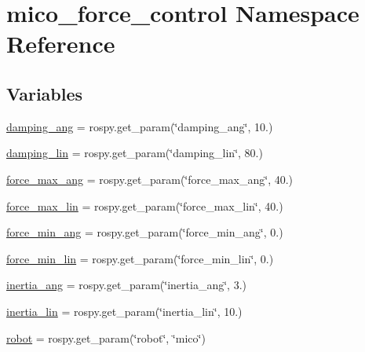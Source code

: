 \hypertarget{namespacemico__force__control}{}\section{mico\+\_\+force\+\_\+control Namespace Reference}
\label{namespacemico__force__control}
\subsection*{Variables}
\begin{DoxyCompactItemize}
\item 
\hyperlink{namespacemico__force__control_a92927656a13dc0f41e49ba262d47d74a}{damping\+\_\+ang} = rospy.\+get\+\_\+param(\char`\"{}damping\+\_\+ang\char`\"{}, 10.)
\item 
\hyperlink{namespacemico__force__control_a1355006730f1faaee4334f0c43f59746}{damping\+\_\+lin} = rospy.\+get\+\_\+param(\char`\"{}damping\+\_\+lin\char`\"{}, 80.)
\item 
\hyperlink{namespacemico__force__control_a4f12ede33ebf4ea40b54445f58818f18}{force\+\_\+max\+\_\+ang} = rospy.\+get\+\_\+param(\char`\"{}force\+\_\+max\+\_\+ang\char`\"{}, 40.)
\item 
\hyperlink{namespacemico__force__control_aa4fb6bd6977bbc2751bcc1d82e91372b}{force\+\_\+max\+\_\+lin} = rospy.\+get\+\_\+param(\char`\"{}force\+\_\+max\+\_\+lin\char`\"{}, 40.)
\item 
\hyperlink{namespacemico__force__control_a6db552753f1e9477b67bafd6038452c1}{force\+\_\+min\+\_\+ang} = rospy.\+get\+\_\+param(\char`\"{}force\+\_\+min\+\_\+ang\char`\"{}, 0.)
\item 
\hyperlink{namespacemico__force__control_a0ceb8e5eca328f479981a597d6ca88b2}{force\+\_\+min\+\_\+lin} = rospy.\+get\+\_\+param(\char`\"{}force\+\_\+min\+\_\+lin\char`\"{}, 0.)
\item 
\hyperlink{namespacemico__force__control_a15342e572c568a704fb5af7c5865eae3}{inertia\+\_\+ang} = rospy.\+get\+\_\+param(\char`\"{}inertia\+\_\+ang\char`\"{}, 3.)
\item 
\hyperlink{namespacemico__force__control_a7bd9a03e89cd1a75c5b5fd43fe20043d}{inertia\+\_\+lin} = rospy.\+get\+\_\+param(\char`\"{}inertia\+\_\+lin\char`\"{}, 10.)
\item 
\hyperlink{namespacemico__force__control_ae3d8428c9fe2a197c78735d5e2bf7d13}{robot} = rospy.\+get\+\_\+param(\char`\"{}robot\char`\"{}, \char`\"{}mico\char`\"{})
\item 

\end{DoxyCompactItemize}
